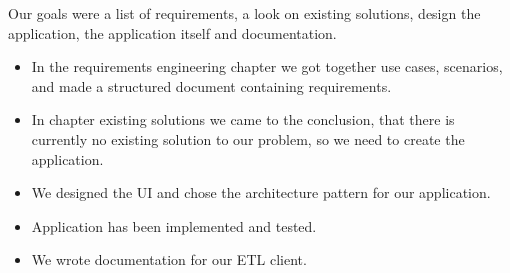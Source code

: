 Our goals were a list of requirements, a look on existing solutions, design the application, the application itself and documentation.

\begin{itemize}
    \item In the requirements engineering chapter we got together use cases, scenarios, and made a structured document containing requirements.
    \item In chapter existing solutions we came to the conclusion, that there is currently no existing solution to our problem, so we need to create the application.
    \item We designed the UI and chose the architecture pattern for our application.
    \item Application has been implemented and tested.
    \item We wrote documentation for our ETL client.
\end{itemize}